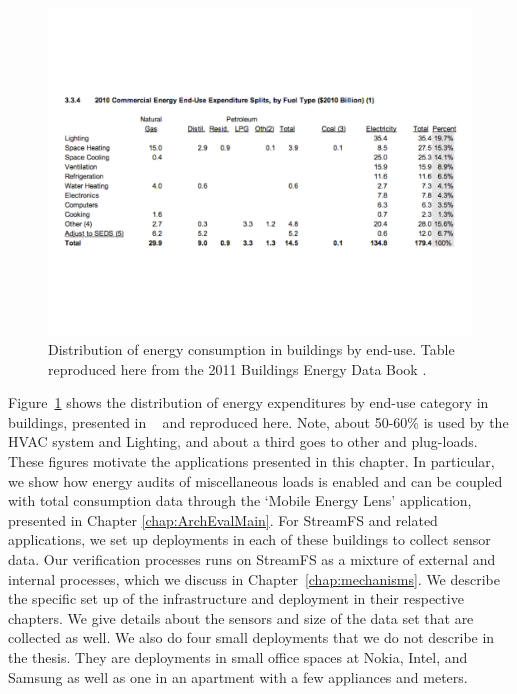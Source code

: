 \begin{figure}[t!] %
\centering
\includegraphics[width=1.0\columnwidth]{figs/end_use_fuel_type}
\caption{Distribution of energy consumption in buildings by end-use.  Table reproduced here from the 2011 Buildings 
Energy Data Book \cite{epabuildings}.}
\label{fig:end_use_energy}
\end{figure}

Figure~\ref{fig:end_use_energy} shows the distribution of energy expenditures by end-use category in buildings, presented in ~\cite{epabuildings} and
reproduced here.  Note, about 50-60\% is used by the HVAC system and Lighting, and about a third goes to other and plug-loads.  These figures
motivate the applications presented in this chapter.  In particular, we show how energy audits of miscellaneous loads is enabled and can be coupled
with total consumption data through the `Mobile Energy Lens' application, presented in Chapter \ref{chap:ArchEvalMain}.
For StreamFS and related applications, we set up deployments in each of these buildings to collect sensor data.  Our verification
processes runs on StreamFS as a mixture of external and internal processes, which we discuss in Chapter~\ref{chap:mechanisms}.
We describe the specific set up of the infrastructure and deployment in their respective chapters.  We give details 
about the sensors and size of the data set that are collected as well.
We also do four small deployments that we do not describe in the thesis.  They are deployments in small office spaces at 
Nokia, Intel, and Samsung as well as one in an apartment with a few appliances and meters.




